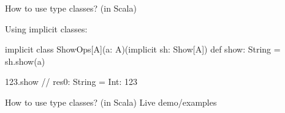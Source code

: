 \documentclass[13pt]{beamer}
\begin{document}
\begin{frame}[fragile]{How to use type classes? (in Scala)}
  \note {
  }

  Using implicit classes:

  \begin{scalaCode}
    implicit class ShowOps[A](a: A)(implicit sh: Show[A]) {
      def show: String = sh.show(a)
    }

    123.show
    // res0: String = Int: 123
  \end{scalaCode}
\end{frame}

\begin{frame}{How to use type classes? (in Scala)}
  \note {
  }
  Live demo/examples
\end{frame}
\end{document}
